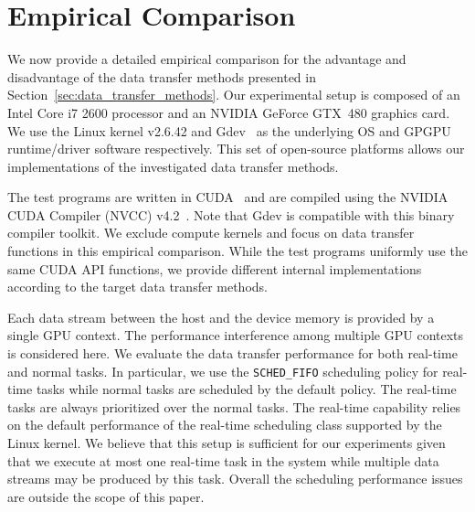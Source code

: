\section{Empirical Comparison}
\label{sec:empirical_comparison}

We now provide a detailed empirical comparison for the advantage and
disadvantage of the data transfer methods presented in
Section~\ref{sec:data_transfer_methods}.
Our experimental setup is composed of an Intel Core i7 2600 processor
and an NVIDIA GeForce GTX~480 graphics card.
We use the Linux kernel v2.6.42 and Gdev~\cite{Kato_ATC12} as the
underlying OS and GPGPU runtime/driver software respectively.
This set of open-source platforms allows our implementations of the
investigated data transfer methods.

The test programs are written in CUDA~\cite{NVIDIA_CUDA} and are compiled
using the NVIDIA CUDA Compiler (NVCC) v4.2~\cite{NVIDIA_NVCC}.
Note that Gdev is compatible with this binary compiler toolkit.
We exclude compute kernels and focus on data transfer functions in this
empirical comparison.
While the test programs uniformly use the same CUDA API functions, we
provide different internal implementations according to the target data
transfer methods.

Each data stream between the host and the device memory is provided by a
single GPU context.
The performance interference among multiple GPU contexts is considered here.
We evaluate the data transfer performance for both real-time and normal
tasks.
In particular, we use the \texttt{SCHED\_FIFO} scheduling policy for
real-time tasks while normal tasks are scheduled by the default policy.
The real-time tasks are always prioritized over the normal tasks.
The real-time capability relies on the default performance of the
real-time scheduling class supported by the Linux kernel.
We believe that this setup is sufficient for our experiments given that
we execute at most one real-time task in the system while multiple data
streams may be produced by this task.
Overall the scheduling performance issues are outside the scope of this
paper.

